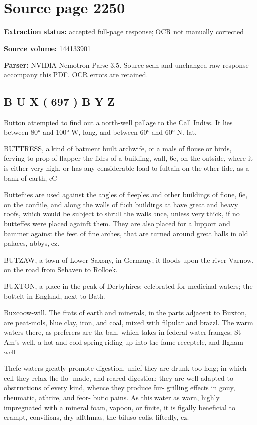 \clearpage
\section{Source page 2250}
\textbf{Extraction status:} accepted full-page response; OCR not manually corrected\par
\textbf{Source volume:} 144133901\par
\textbf{Parser:} NVIDIA Nemotron Parse 3.5. Source scan and unchanged raw response accompany this PDF. OCR errors are retained.\par\medskip
\subsection*{B U X ( 697 ) B Y Z}
Button attempted to find out a north-well pallage to the Call Indies. It lies between 80° and 100° W, long, and between 60° and 60° N. lat.\par\medskip
BUTTRESS, a kind of batment built archwife, or a mals of flouse or birds, ferving to prop of flapper the fides of a building, wall, 6e, on the outside, where it is either very high, or has any considerable load to fultain on the other fide, as a bank of earth, eC\par\medskip
Butteflies are used against the angles of fleeples and other buildings of flone, 6e, on the confiile, and along the walls of fuch buildings at have great and heavy roofs, which would be subject to shrull the walls once, unless very thick, if no butteffes were placed againft them. They are also placed for a lupport and bammer against the feet of fine arches, that are turned around great halls in old palaces, abbys, cz.\par\medskip
BUTZAW, a town of Lower Saxony, in Germany; it floods upon the river Varnow, on the road from Sehaven to Rolloek.\par\medskip
BUXTON, a place in the peak of Derbyhires; celebrated for medicinal waters; the bottelt in England, next to Bath.\par\medskip
Buxcoow-will. The frats of earth and minerals, in the parts adjacent to Buxton, are peat-mols, blue clay, iron, and coal, mixed with filpular and brazzl. The warm waters there, as preferers are the ban, which takes in federal water-franges; St Am’s well, a hot and cold spring riding up into the fame receptele, and Ilgham-well.\par\medskip
Thefe waters greatly promote digestion, unief they are drunk too long; in which cell they relax the flo- made, and reared digestion; they are well adapted to obstructions of every kind, whence they produce fur- grilling effects in gouy, rheumatic, athrire, and feor- butic pains. As this water as warn, highly impregnated with a mineral foam, vapoon, or finite, it is figally beneficial to crampt, convilions, dry affthmas, the biluso colis, liftedly, cz.\par\medskip
